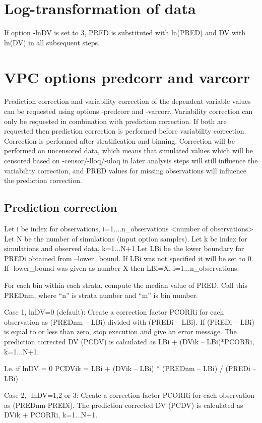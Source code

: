 \section{Log-transformation of data}
If option -lnDV is set to 3,  PRED is substituted with ln(PRED) and DV with ln(DV) in all subsequent steps. 

\section{VPC options predcorr and varcorr }
Prediction correction and variability correction of the dependent variable values can be requested using options -predcorr and -varcorr. Variability correction can only be requested in combination with prediction correction. If both are requested then prediction correction is performed before variability correction. Correction is performed after stratification and binning. Correction will be performed on uncensored data, which means that simulated values which will be censored based on -censor/-lloq/-uloq in later analysis steps will still influence the variability correction, and PRED values for missing observations will influence the prediction correction.

\subsection{Prediction correction}
Let i be index for observations, i=1....n\_observations <number of observations>
Let N be the number of simulations (input option samples).
Let k be index for simulations and observed data, k=1...N+1
Let LBi be the lower boundary for PREDi obtained from –lower\_bound. If LBi was not specified it will be set to 0. If -lower\_bound was given as number X then LBi=X, i=1...n\_observations.

For each bin within each strata, compute the median value of PRED. Call this PREDnm, where “n” is strata number and “m” is bin number. 

Case 1, lnDV=0 (default): Create a correction factor PCORRi for each observation as (PREDnm – LBi) divided with (PREDi – LBi). If (PREDi – LBi) is equal to or less than zero, stop execution and give an error message. The prediction corrected DV (PCDV) is calculated as 
LBi + (DVik – LBi)*PCORRi, k=1...N+1. 

I.e. if lnDV = 0		PCDVik = LBi + (DVik – LBi) * (PREDnm – LBi) / (PREDi – LBi)

Case 2, -lnDV=1,2 or 3: Create a correction factor PCORRi for each observation as (PREDnm-PREDi). The prediction corrected DV (PCDV) is calculated as DVik + PCORRi, k=1...N+1.   

